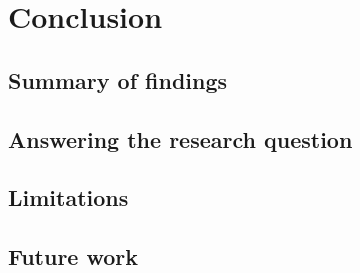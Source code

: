 \chapter*{Conclusion}

\section*{Summary of findings}
\section*{Answering the research question}
\section*{Limitations}
\section*{Future work}
